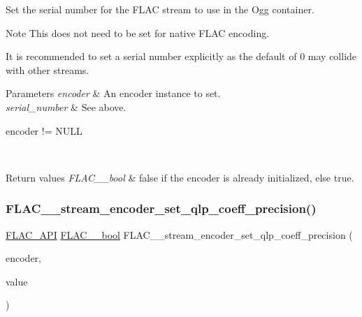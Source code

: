 Set the serial number for the F\+L\+AC stream to use in the Ogg container.

\begin{DoxyNote}{Note}
This does not need to be set for native F\+L\+AC encoding.

It is recommended to set a serial number explicitly as the default of \textquotesingle{}0\textquotesingle{} may collide with other streams.
\end{DoxyNote}
{} 
\begin{DoxyParams}{Parameters}
{\em encoder} & An encoder instance to set. \\
\hline
{\em serial\+\_\+number} & See above.  
\begin{DoxyCode}
encoder != NULL 
\end{DoxyCode}
 \\
\hline
\end{DoxyParams}

\begin{DoxyRetVals}{Return values}
{\em F\+L\+A\+C\+\_\+\+\_\+bool} & {\ttfamily false} if the encoder is already initialized, else {\ttfamily true}. \\
\hline
\end{DoxyRetVals}
\mbox{\label{group__flac__stream__encoder_ga0888d739c952ff73456bf90e48634514}} 
\subsubsection{\texorpdfstring{F\+L\+A\+C\+\_\+\+\_\+stream\+\_\+encoder\+\_\+set\+\_\+qlp\+\_\+coeff\+\_\+precision()}{FLAC\_\_stream\_encoder\_set\_qlp\_coeff\_precision()}}
{\footnotesize\ttfamily \hyperlink{group__flac__export_ga56ca07df8a23310707732b1c0007d6f5}{F\+L\+A\+C\+\_\+\+A\+PI} \hyperlink{ordinals_8h_a95103469f1cbd78b8cf250194985b34e}{F\+L\+A\+C\+\_\+\+\_\+bool} F\+L\+A\+C\+\_\+\+\_\+stream\+\_\+encoder\+\_\+set\+\_\+qlp\+\_\+coeff\+\_\+precision (\begin{DoxyParamCaption}\item[{\hyperlink{struct_f_l_a_c_____stream_encoder}{F\+L\+A\+C\+\_\+\+\_\+\+Stream\+Encoder} $\ast$}]{encoder,  }\item[{unsigned}]{value }\end{DoxyParamCaption})}

